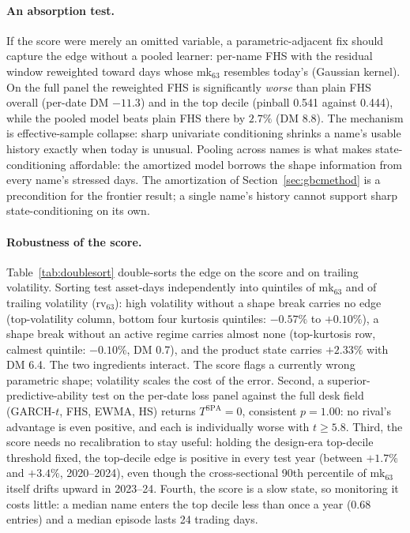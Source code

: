 \documentclass[11pt]{article}
\theoremstyle{remark}
\begin{document}
\paragraph{An absorption test.} If the score were merely an omitted
variable, a parametric-adjacent fix should capture the edge without a
pooled learner: per-name FHS with the residual window reweighted
toward days whose mk$_{63}$ resembles today's (Gaussian kernel). On
the full panel the reweighted FHS is significantly \emph{worse} than
plain FHS overall (per-date DM $-11.3$) and in the top decile (pinball
0.541 against 0.444), while the pooled model beats plain FHS there by
$2.7\%$ (DM 8.8). The mechanism is effective-sample collapse: sharp
univariate conditioning shrinks a name's usable history exactly when
today is unusual. Pooling across names is what makes state-conditioning affordable: the amortized model borrows the shape information from every name's
stressed days. The amortization of Section~\ref{sec:gbcmethod} is a
precondition for the frontier result; a single name's history cannot
support sharp state-conditioning on its own.

\paragraph{Robustness of the score.} Table~\ref{tab:doublesort} double-sorts the edge on the score and on
trailing volatility. Sorting
test asset-days independently into quintiles of mk$_{63}$ and of
trailing volatility (rv$_{63}$): high volatility without a shape break
carries no edge (top-volatility column, bottom four kurtosis quintiles:
$-0.57\%$ to $+0.10\%$), a shape break without an active regime
carries almost none (top-kurtosis row, calmest quintile: $-0.10\%$,
DM 0.7), and the product state carries $+2.33\%$ with DM 6.4. The two ingredients interact. The score flags a currently wrong
parametric shape; volatility scales the cost of the error. Second, a
superior-predictive-ability test \citep{hansen2005spa} on the per-date
loss panel against the full desk field (GARCH-$t$, FHS, EWMA, HS)
returns $T^{\mathrm{SPA}} = 0$, consistent $p = 1.00$: no rival's
advantage is even positive, and each is individually worse with
$t \geq 5.8$. Third, the score needs no recalibration to stay useful:
holding the design-era top-decile threshold fixed, the top-decile edge
is positive in every test year (between $+1.7\%$ and $+3.4\%$,
2020--2024), even though the cross-sectional 90th percentile of
mk$_{63}$ itself drifts upward in 2023--24. Fourth, the score is a slow
state, so monitoring it costs little: a median name enters the top
decile less than once a year (0.68 entries) and a median episode lasts
24 trading days.
\end{document}
